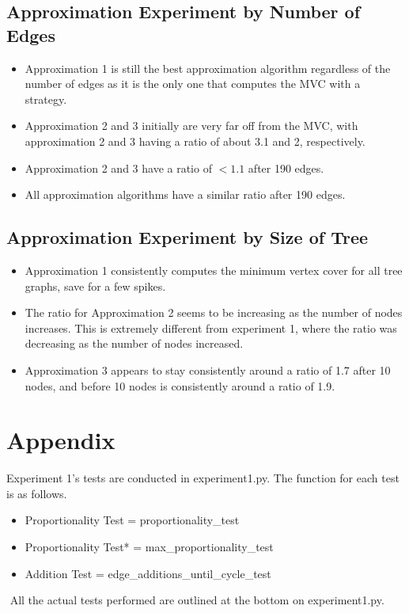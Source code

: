 \documentclass[12pt]{article}
\begin{document}
\subsection{Approximation Experiment by Number of Edges}

\begin{itemize}
    \item Approximation 1 is still the best approximation algorithm regardless of the number of edges as it is the only one that computes the MVC with a strategy.
    \item Approximation 2 and 3 initially are very far off from the MVC, with approximation 2 and 3 having a ratio of about 3.1 and 2, respectively.
    \item Approximation 2 and 3 have a ratio of $<1.1$ after 190 edges.
    \item All approximation algorithms have a similar ratio after 190 edges.
\end{itemize}

\subsection{Approximation Experiment by Size of Tree}

\begin{itemize}
    \item Approximation 1 consistently computes the minimum vertex cover for all tree graphs, save for a few spikes.
    \item The ratio for Approximation 2 seems to be increasing as the number of nodes increases. This is extremely different from experiment 1, where the ratio was decreasing as the number of nodes increased.
    \item Approximation 3 appears to stay consistently around a ratio of 1.7 after 10 nodes, and before 10 nodes is consistently around a ratio of 1.9.
\end{itemize}


%
%
%
%
\newpage
\section{Appendix}

Experiment 1's tests are conducted in experiment1.py.
The function for each test is as follows.
\begin{itemize}
    \item Proportionality Test = proportionality\_test\(\)
    \item Proportionality Test* = max\_proportionality\_test\(\)
    \item Addition Test = edge\_additions\_until\_cycle\_test\(\)
\end{itemize}
$ $
\newline
All the actual tests performed are outlined at the bottom on experiment1.py.
\newline
$ $
\newline
\end{document}
